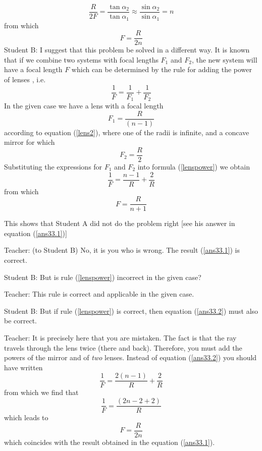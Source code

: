 \documentclass[a4paper,12pt]{book}
\begin{document}
{\begin{equation*}
\frac{R}{2F} = \frac{\tan \alpha_{2}}{\tan \alpha_{1}} \approx \frac{\sin \alpha_{2}}{ \sin \alpha_{1}} = n
\end{equation*}
 from which
\begin{equation}
F = \frac{R}{2n} \label{ans33.1}
\end{equation}
{\sc Student B:} I suggest that this problem be solved in a different way. It is known that if we combine two systems with focal lengths $F_{1}$ and $F_{2}$, the new system will have a focal length $F$ which can be determined by the rule for adding the power of lenses , i.e. 
\begin{equation}
\frac{1}{F} = \frac{1}{F_{1}}+\frac{1}{F_{2}} \label{lenspower}
\end{equation}
In the given case we have a lens with a focal length 
\begin{equation*}
F_{1} = \frac{R}{ (n-1)}
\end{equation*}
according to equation (\ref{lens2}), where one of the radii is infinite, and a concave mirror for which 
\begin{equation*}
F_{2} = \frac{R}{2}
\end{equation*}
Substituting the expressions for $F_{1}$ and $F_{2}$ into formula (\ref{lenspower}) we obtain
\begin{equation}
\frac{1}{F} = \frac{n-1}{R} + \frac{2}{R} \label{ans33.2}
\end{equation}
from which 
\begin{equation}
F = \frac{R}{n+1}
\end{equation}

This shows that {\sc Student A} did not do the problem right [see his answer in equation (\ref{ans33.1})]

{\sc Teacher: } (to {\sc Student B}) No, it is you who is wrong. The result (\ref{ans33.1}) is correct.

{\sc Student B:} But is rule (\ref{lenspower}) incorrect in the given case?

{\sc Teacher: } This rule is correct and applicable in the given case.

{\sc Student B:} But if rule (\ref{lenspower}) is correct, then equation (\ref{ans33.2}) must also be correct.

{\sc Teacher: } It is precisely here that you are mistaken. The fact is that the ray travels through the lens twice (there and back). Therefore, you must add the powers of the mirror and of \emph{two} lenses. Instead of equation (\ref{ans33.2}) you should have written
\begin{equation*}
\frac{1}{F} = \frac{2(n-1)}{R} + \frac{2}{R}
\end{equation*}
from which we find that 
\begin{equation*}
\frac{1}{F} = \frac{(2n-2+2)}{R} 
\end{equation*}
which leads to
\begin{equation*}
F = \frac{R}{2n}
\end{equation*}
which coincides with the result obtained in the equation (\ref{ans33.1}).

}
\end{document}
